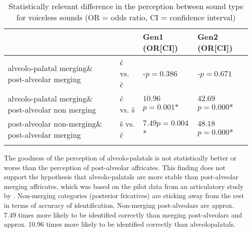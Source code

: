 \documentclass[output=paper,modfonts,newtxmath,hidelinks,]{langscibook}
\begin{document}
\begin{table}
\begin{tabularx}{\textwidth}{p{4.5cm}lXX}
\lsptoprule
&  &  \textbf{Gen1} (OR[CI]) &  \textbf{Gen2} (OR[CI])\\
\midrule
alveolo-palatal merging\newline\& post-alveolar merging & ć vs. č & {}-\newline $p=0.386$ & {}-\newline $p=0.671$\vspace{20pt}\\
alveolo-palatal merging\newline\& post-alveolar non merging & ć vs. š & $10.96$\newline[$2.85$--$42.06$]\newline $p=0.001$*& $42.69$\newline[$9.89$--$184.38$]\newline $p=0.000$*\vspace{6pt}\\
post-alveolar non-merging\newline\& post-alveolar merging & š vs. č & $7.49$\newline[$1.07$--$29.05$]\newline $p=0.004$* & $48.18$ \newline [$11.17$--$207.89$]\newline $p=0.000$*\\
\lspbottomrule
\end{tabularx}
\caption{\label{tab:mihajlovic:7} Statistically relevant difference in the perception between sound type for voiceless sounds (OR = odds ratio, CI = confidence interval)}
\end{table}



The goodness of the perception of alveolo-palatals is not statistically better or worse than the perception of post-alveolar affricates. This finding does not support the hypothesis that alveolo-palatals are more stable than post-alveolar merging affricates, which was based on the pilot data from an articulatory study by \citet{Cavar-etal2016}. Non-merging categories (posterior fricatives) are sticking away from the rest in terms of accuracy of identification. Non-merging post-alveolars are approx. 7.49 times more likely to be identified correctly than merging post-alveolars and approx. 10.96 times more likely to be identified correctly than alveolopalatals.
\end{document}
